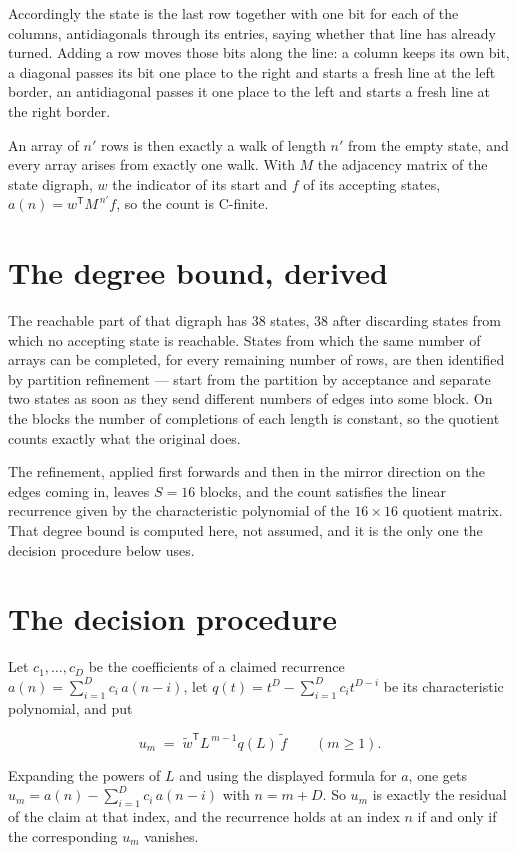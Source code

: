 \documentclass[11pt]{article}
\theoremstyle{definition}
\begin{document}
Accordingly the state is the last row together with one bit for each of the columns, antidiagonals through its entries, saying whether that line has already turned. Adding a row moves those bits along the line: a column keeps its own bit, a diagonal passes its bit one place to the right and starts a fresh line at the left border, an antidiagonal passes it one place to the left and starts a fresh line at the right border.

An array of $n'$ rows is then exactly a walk of length $n'$ from the empty state, and every array arises from exactly one walk. With $M$ the adjacency matrix of the state digraph, $w$ the indicator of its start and $f$ of its accepting states, $a(n) = w^{\mathsf T}M^{\,n'}f$, so the count is C-finite.

\section{The degree bound, derived}

The reachable part of that digraph has $38$ states, $38$ after discarding states from which no accepting state is reachable. States from which the same number of arrays can be completed, for every remaining number of rows, are then identified by partition refinement --- start from the partition by acceptance and separate two states as soon as they send different numbers of edges into some block. On the blocks the number of completions of each length is constant, so the quotient counts exactly what the original does.

The refinement, applied first forwards and then in the mirror direction on the edges coming in, leaves $S = 16$ blocks, and the count satisfies the linear recurrence given by the characteristic polynomial of the $16 \times 16$ quotient matrix. That degree bound is computed here, not assumed, and it is the only one the decision procedure below uses.

\section{The decision procedure}

Let $c_1,\dots,c_D$ be the coefficients of a claimed recurrence $a(n) = \sum_{i=1}^{D} c_i\,a(n-i)$, let $q(t) = t^{D} - \sum_{i=1}^{D} c_i t^{D-i}$ be its characteristic polynomial, and put

\[u_m \;=\; \tilde w^{\mathsf T} L^{\,m-1} q(L)\,\tilde f \qquad (m \ge 1).\]

Expanding the powers of $L$ and using the displayed formula for $a$, one gets $u_m = a(n) - \sum_{i=1}^{D} c_i\,a(n-i)$ with $n = m + D$. So $u_m$ is exactly the residual of the claim at that index, and the recurrence holds at an index $n$ if and only if the corresponding $u_m$ vanishes.
\end{document}
